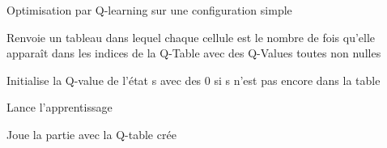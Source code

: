 \documentclass[letterpaper,10pt,french]{sphinxmanual}
\begin{document}
\begin{fulllineitems}
\label{\detokenize{index:qRL_optimizer.QRLOptimizer}}
Optimisation par Q-learning sur une configuration simple

\begin{fulllineitems}
\label{\detokenize{index:qRL_optimizer.QRLOptimizer.getQIndexes}}
Renvoie un tableau dans lequel chaque cellule est le nombre
de fois qu’elle apparaît dans les indices de la Q-Table 
avec des Q-Values toutes non nulles

\end{fulllineitems}


\begin{fulllineitems}
\label{\detokenize{index:qRL_optimizer.QRLOptimizer.initQValue}}
Initialise la Q-value de l’état s avec des 0 si s n’est pas encore dans la table

\end{fulllineitems}


\begin{fulllineitems}
\label{\detokenize{index:qRL_optimizer.QRLOptimizer.learn}}
Lance l’apprentissage

\end{fulllineitems}


\begin{fulllineitems}
\label{\detokenize{index:qRL_optimizer.QRLOptimizer.play}}
Joue la partie avec la Q-table crée

\end{fulllineitems}



\end{fulllineitems}
\end{document}
